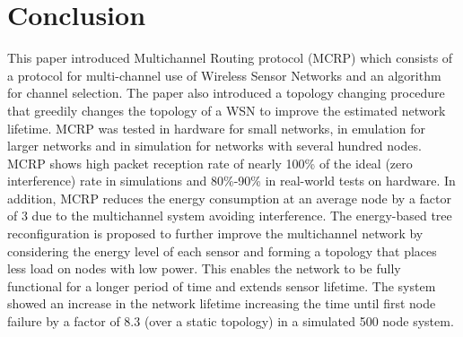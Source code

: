 \section{Conclusion}
\label{Conclusion}

This paper introduced Multichannel Routing protocol (MCRP) which consists of a protocol for multi-channel use of Wireless Sensor Networks and an algorithm for channel selection. The paper also introduced a topology changing procedure that greedily changes the topology of a WSN to improve the estimated network lifetime.  MCRP was tested in hardware for small networks, in emulation for larger networks and in simulation for networks with several hundred nodes.  MCRP shows high packet reception rate of nearly 100\% of the ideal (zero interference) rate in simulations and 80\%-90\% in real-world tests on hardware. In addition, MCRP reduces the energy consumption at an average node by a factor of 3 due to the multichannel system avoiding interference.  The energy-based tree reconfiguration is proposed to further improve the multichannel network by considering the energy level of each sensor and forming a topology that places less load on nodes with low power. 
This enables the network to be fully functional for a longer period of time and extends sensor lifetime.  The system showed an increase in the network lifetime increasing the time until first node failure by a factor of 8.3 (over a static topology) in a simulated 500 node system.
